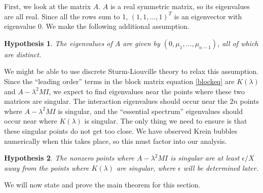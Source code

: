\documentclass[12pt]{article}
\newtheorem{hypothesis}{Hypothesis}
\begin{document}
First, we look at the matrix $A$. $A$ is a real symmetric matrix, so its eigenvalues are all real. Since all the rows sum to 1, $(1, 1, \dots, 1)^T$ is an eigenvector with eigenvalue 0. We make the following additional assumption.\\

\begin{hypothesis}\label{Adistincteigs}
The eigenvalues of $A$ are given by $(0, \mu_1, \dots, \mu_{n-1})$, all of which are distinct.
\end{hypothesis}

We might be able to use discrete Sturm-Liouville theory to relax this assumption.\\

Since the ``leading order'' terms in the block matrix equation \ref{blockeq} are $K(\lambda)$ and $A - \lambda^2 M I$, we expect to find eigenvalues near the points where these two matrices are singular. The interaction eigenvalues should occur near the $2n$ points where $A - \lambda^2 M I$ is singular, and the ``essential spectrum'' eigenvalues should occur near where $K(\lambda)$ is singular. The only thing we need to ensure is that these singular points do not get too close. We have observed Krein bubbles numerically when this takes place, so this must factor into our analysis.

\begin{hypothesis}\label{epsilonballs}
The nonzero points where $A - \lambda^2 MI$ is singular are at least $\epsilon/X$ away from the points where $K(\lambda)$ are singular, where $\epsilon$ will be determined later.
\end{hypothesis}

We will now state and prove the main theorem for this section.
\end{document}
